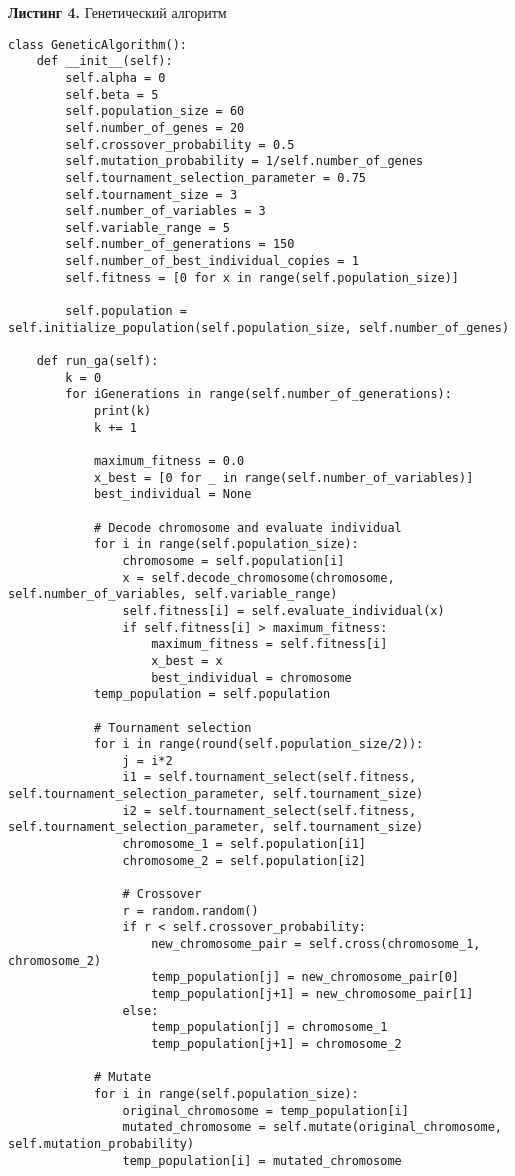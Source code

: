 \documentclass[a4paper, 12pt]{article}   	%
\begin{document}
\textbf{Листинг 4.} Генетический алгоритм  
    \begin{verbatim}
class GeneticAlgorithm():
	def __init__(self):
		self.alpha = 0
		self.beta = 5
		self.population_size = 60
		self.number_of_genes = 20
		self.crossover_probability = 0.5
		self.mutation_probability = 1/self.number_of_genes
		self.tournament_selection_parameter = 0.75
		self.tournament_size = 3
		self.number_of_variables = 3
		self.variable_range = 5
		self.number_of_generations = 150
		self.number_of_best_individual_copies = 1
		self.fitness = [0 for x in range(self.population_size)]

		self.population = self.initialize_population(self.population_size, self.number_of_genes)

	def run_ga(self):
		k = 0
		for iGenerations in range(self.number_of_generations):
			print(k)
			k += 1

			maximum_fitness = 0.0
			x_best = [0 for _ in range(self.number_of_variables)]
			best_individual = None

			# Decode chromosome and evaluate individual
			for i in range(self.population_size):
				chromosome = self.population[i]
				x = self.decode_chromosome(chromosome, self.number_of_variables, self.variable_range)
				self.fitness[i] = self.evaluate_individual(x)
				if self.fitness[i] > maximum_fitness:
					maximum_fitness = self.fitness[i]
					x_best = x
					best_individual = chromosome
			temp_population = self.population

			# Tournament selection
			for i in range(round(self.population_size/2)):
				j = i*2
				i1 = self.tournament_select(self.fitness, self.tournament_selection_parameter, self.tournament_size)
				i2 = self.tournament_select(self.fitness, self.tournament_selection_parameter, self.tournament_size)
				chromosome_1 = self.population[i1]
				chromosome_2 = self.population[i2]

				# Crossover
				r = random.random()
				if r < self.crossover_probability:
					new_chromosome_pair = self.cross(chromosome_1, chromosome_2)
					temp_population[j] = new_chromosome_pair[0]
					temp_population[j+1] = new_chromosome_pair[1]
				else:
					temp_population[j] = chromosome_1
					temp_population[j+1] = chromosome_2

			# Mutate
			for i in range(self.population_size):
				original_chromosome = temp_population[i]
				mutated_chromosome = self.mutate(original_chromosome, self.mutation_probability)
				temp_population[i] = mutated_chromosome


\end{verbatim}
\end{document}
